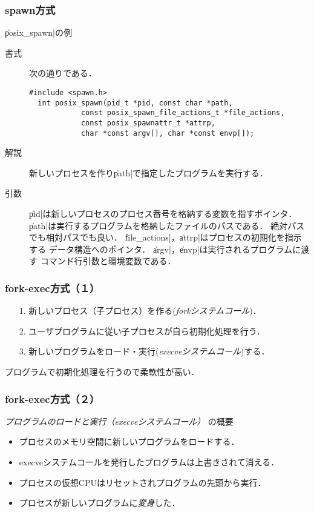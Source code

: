 \documentclass{beamer}                 %
\begin{document}
\begin{frame}[fragile]
  \frametitle{spawn方式}
  \|posix_spawn|の例 \\
  \begin{description}
  \item[書式] 次の通りである．
\begin{lstlisting}[numbers=none]
  #include <spawn.h>
  int posix_spawn(pid_t *pid, const char *path,
            const posix_spawn_file_actions_t *file_actions,
            const posix_spawnattr_t *attrp,
            char *const argv[], char *const envp[]);
\end{lstlisting}

  \item[解説]
    新しいプロセスを作り\|path|で指定したプログラムを実行する．

  \item[引数]
    \|pid|は新しいプロセスのプロセス番号を格納する変数を指すポインタ．
    \|path|は実行するプログラムを格納したファイルのパスである．
    絶対パスでも相対パスでも良い．
    \|file_actions|，\|attrp|はプロセスの初期化を指示する
    データ構造へのポインタ．
    \|argv|，\|envp|は実行されるプログラムに渡す
    コマンド行引数と環境変数である．
  \end{description}
\end{frame}

\begin{frame}[fragile]
  \frametitle{fork-exec方式（１）}
  \begin{enumerate}
  \item[1.] 新しいプロセス（子プロセス）を作る(\emph{forkシステムコール})．
  \item[2.] ユーザプログラムに従い子プロセスが自ら初期化処理を行う．
  \item[3.] 新しいプログラムをロード・実行(\emph{execveシステムコール})する．
  \end{enumerate}
  プログラムで初期化処理を行うので柔軟性が高い．
  \vfill
\end{frame}

\begin{frame}[fragile]
  \frametitle{fork-exec方式（２）}
  \emph{プログラムのロードと実行（execveシステムコール）} の概要\\
  \begin{itemize}
  \item プロセスのメモリ空間に新しいプログラムをロードする．
  \item execveシステムコールを発行したプログラムは上書きされて消える．
  \item プロセスの仮想CPUはリセットされプログラムの先頭から実行．
  \item プロセスが新しいプログラムに\emph{変身}した．
  \end{itemize}
\end{frame}
\end{document}

